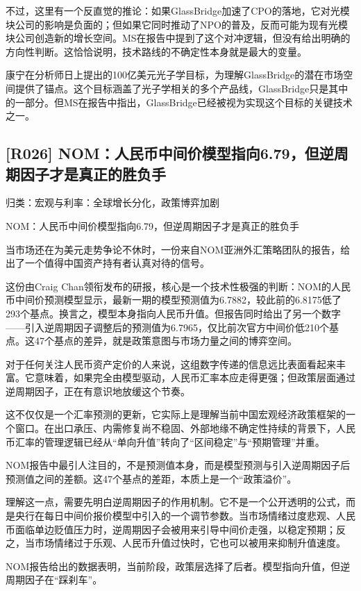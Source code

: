 \documentclass[11pt]{ctexart}
\begin{document}
不过，这里有一个反直觉的推论：如果GlassBridge加速了CPO的落地，它对光模块公司的影响是负面的；但如果它同时推动了NPO的普及，反而可能为现有光模块公司创造新的增长空间。MS在报告中提到了这个对冲逻辑，但没有给出明确的方向性判断。这恰恰说明，技术路线的不确定性本身就是最大的变量。

康宁在分析师日上提出的100亿美元光子学目标，为理解GlassBridge的潜在市场空间提供了锚点。这个目标涵盖了光子学相关的多个产品线，GlassBridge只是其中的一部分。但MS在报告中指出，GlassBridge已经被视为实现这个目标的关键技术之一。

\subsection{[R026] NOM：人民币中间价模型指向6.79，但逆周期因子才是真正的胜负手}
{\small\color{refgray}归类：宏观与利率：全球增长分化，政策博弈加剧}

NOM：人民币中间价模型指向6.79，但逆周期因子才是真正的胜负手

当市场还在为美元走势争论不休时，一份来自NOM亚洲外汇策略团队的报告，给出了一个值得中国资产持有者认真对待的信号。

这份由Craig Chan领衔发布的研报，核心是一个技术性极强的判断：NOM的人民币中间价预测模型显示，最新一期的模型预测值为6.7882，较此前的6.8175低了293个基点。换言之，模型本身指向人民币升值。但报告同时给出了另一个数字——引入逆周期因子调整后的预测值为6.7965，仅比前次官方中间价低210个基点。这47个基点的差异，就是政策意图与市场力量之间的博弈空间。

对于任何关注人民币资产定价的人来说，这组数字传递的信息远比表面看起来丰富。它意味着，如果完全由模型驱动，人民币汇率本应走得更强；但政策层面通过逆周期因子，正在有意识地放缓这个节奏。

这不仅仅是一个汇率预测的更新，它实际上是理解当前中国宏观经济政策框架的一个窗口。在出口承压、内需修复尚不稳固、外部地缘不确定性持续的背景下，人民币汇率的管理逻辑已经从“单向升值”转向了“区间稳定”与“预期管理”并重。

NOM报告中最引人注目的，不是预测值本身，而是模型预测与引入逆周期因子后预测值之间的差额。这47个基点的差距，本质上是一个“政策溢价”。

理解这一点，需要先明白逆周期因子的作用机制。它不是一个公开透明的公式，而是央行在每日中间价报价模型中引入的一个调节参数。当市场情绪过度悲观、人民币面临单边贬值压力时，逆周期因子会被用来引导中间价走强，以稳定预期；反之，当市场情绪过于乐观、人民币升值过快时，它也可以被用来抑制升值速度。

NOM报告给出的数据表明，当前阶段，政策层选择了后者。模型指向升值，但逆周期因子在“踩刹车”。
\end{document}
